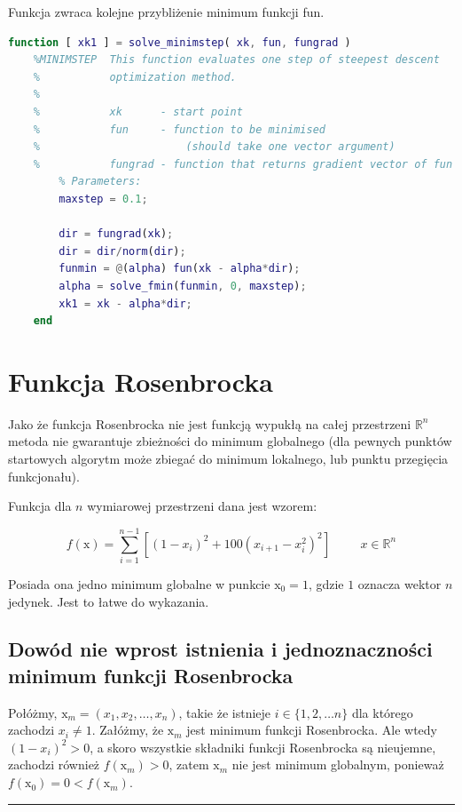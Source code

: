 \documentclass[12pt]{article}
\begin{document}
Funkcja zwraca kolejne przybliżenie minimum funkcji fun.

\begin{lstlisting}[language=MATLAB, style=mystyle]
    function [ xk1 ] = solve_minimstep( xk, fun, fungrad )
    %MINIMSTEP  This function evaluates one step of steepest descent
    %           optimization method.
    %
    %           xk      - start point
    %           fun     - function to be minimised
    %                       (should take one vector argument)
    %           fungrad - function that returns gradient vector of fun
        % Parameters:
        maxstep = 0.1;
    
        dir = fungrad(xk);
        dir = dir/norm(dir);
        funmin = @(alpha) fun(xk - alpha*dir);
        alpha = solve_fmin(funmin, 0, maxstep);
        xk1 = xk - alpha*dir;
    end
\end{lstlisting}

\newpage

\section*{Funkcja Rosenbrocka}

Jako że funkcja Rosenbrocka nie jest funkcją wypukłą na całej przestrzeni
$\mathbb{R}^{n}$ metoda nie gwarantuje zbieżności do minimum globalnego (dla
pewnych punktów startowych algorytm może zbiegać do minimum lokalnego, lub
punktu przegięcia funkcjonału).

Funkcja dla $n$ wymiarowej przestrzeni dana jest wzorem:

\begin{equation}
    f(\mathrm{x}) = \sum^{n-1}_{i=1} \left[(1-x_i)^2 + 100(x_{i+1} -
    x_i^2)^2\right] \hspace{1cm} x \in \mathbb{R}^n
\end{equation}

Posiada ona jedno minimum globalne w punkcie
$\mathrm{x}_0 = \textrm{1}$, gdzie $1$ oznacza wektor $n$ jedynek. Jest to
łatwe do wykazania.

\subsection*{Dowód nie wprost istnienia i jednoznaczności minimum funkcji
Rosenbrocka}

Połóżmy, $\mathrm{x}_m = (x_1, x_2, \ldots, x_n)$, takie że istnieje $i \in
\{1,2,\ldots n\}$ dla którego zachodzi $x_i \neq 1$. Załóżmy, że $\mathrm{x}_m$
jest minimum funkcji Rosenbrocka. Ale wtedy $(1-x_i)^2 > 0$, a skoro wszystkie
składniki funkcji Rosenbrocka są nieujemne, zachodzi również $f(\mathrm{x}_m) >
0$, zatem $\mathrm{x}_m$ nie jest minimum globalnym, ponieważ $f(\mathrm{x}_0)
= 0 < f(\mathrm{x}_m)$.\\ \rule{1ex}{1ex}
\end{document}
